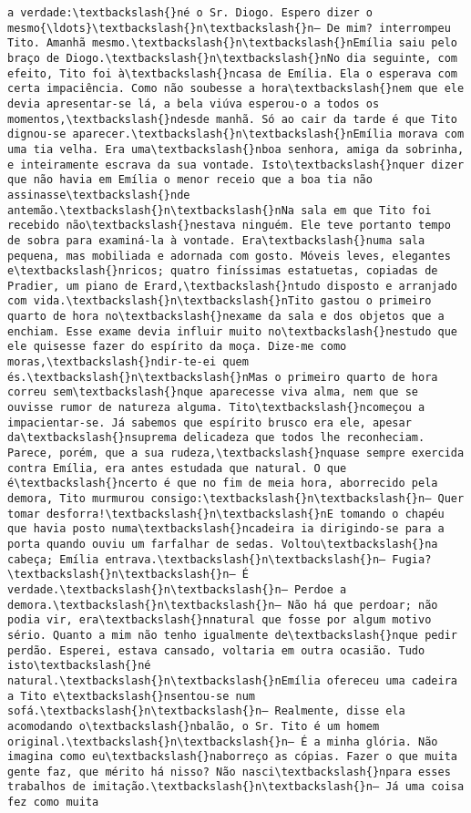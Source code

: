 \begin{Verbatim}[commandchars=\\\{\}]
a verdade:\textbackslash{}né o Sr. Diogo. Espero dizer o mesmo{\ldots}\textbackslash{}n\textbackslash{}n— De mim? interrompeu Tito. Amanhã mesmo.\textbackslash{}n\textbackslash{}nEmília saiu pelo braço de Diogo.\textbackslash{}n\textbackslash{}nNo dia seguinte, com efeito, Tito foi à\textbackslash{}ncasa de Emília. Ela o esperava com certa impaciência. Como não soubesse a hora\textbackslash{}nem que ele devia apresentar-se lá, a bela viúva esperou-o a todos os momentos,\textbackslash{}ndesde manhã. Só ao cair da tarde é que Tito dignou-se aparecer.\textbackslash{}n\textbackslash{}nEmília morava com uma tia velha. Era uma\textbackslash{}nboa senhora, amiga da sobrinha, e inteiramente escrava da sua vontade. Isto\textbackslash{}nquer dizer que não havia em Emília o menor receio que a boa tia não assinasse\textbackslash{}nde antemão.\textbackslash{}n\textbackslash{}nNa sala em que Tito foi recebido não\textbackslash{}nestava ninguém. Ele teve portanto tempo de sobra para examiná-la à vontade. Era\textbackslash{}numa sala pequena, mas mobiliada e adornada com gosto. Móveis leves, elegantes e\textbackslash{}nricos; quatro finíssimas estatuetas, copiadas de Pradier, um piano de Erard,\textbackslash{}ntudo disposto e arranjado com vida.\textbackslash{}n\textbackslash{}nTito gastou o primeiro quarto de hora no\textbackslash{}nexame da sala e dos objetos que a enchiam. Esse exame devia influir muito no\textbackslash{}nestudo que ele quisesse fazer do espírito da moça. Dize-me como moras,\textbackslash{}ndir-te-ei quem és.\textbackslash{}n\textbackslash{}nMas o primeiro quarto de hora correu sem\textbackslash{}nque aparecesse viva alma, nem que se ouvisse rumor de natureza alguma. Tito\textbackslash{}ncomeçou a impacientar-se. Já sabemos que espírito brusco era ele, apesar da\textbackslash{}nsuprema delicadeza que todos lhe reconheciam. Parece, porém, que a sua rudeza,\textbackslash{}nquase sempre exercida contra Emília, era antes estudada que natural. O que é\textbackslash{}ncerto é que no fim de meia hora, aborrecido pela demora, Tito murmurou consigo:\textbackslash{}n\textbackslash{}n— Quer tomar desforra!\textbackslash{}n\textbackslash{}nE tomando o chapéu que havia posto numa\textbackslash{}ncadeira ia dirigindo-se para a porta quando ouviu um farfalhar de sedas. Voltou\textbackslash{}na cabeça; Emília entrava.\textbackslash{}n\textbackslash{}n— Fugia?\textbackslash{}n\textbackslash{}n— É verdade.\textbackslash{}n\textbackslash{}n— Perdoe a demora.\textbackslash{}n\textbackslash{}n— Não há que perdoar; não podia vir, era\textbackslash{}nnatural que fosse por algum motivo sério. Quanto a mim não tenho igualmente de\textbackslash{}nque pedir perdão. Esperei, estava cansado, voltaria em outra ocasião. Tudo isto\textbackslash{}né natural.\textbackslash{}n\textbackslash{}nEmília ofereceu uma cadeira a Tito e\textbackslash{}nsentou-se num sofá.\textbackslash{}n\textbackslash{}n— Realmente, disse ela acomodando o\textbackslash{}nbalão, o Sr. Tito é um homem original.\textbackslash{}n\textbackslash{}n— É a minha glória. Não imagina como eu\textbackslash{}naborreço as cópias. Fazer o que muita gente faz, que mérito há nisso? Não nasci\textbackslash{}npara esses trabalhos de imitação.\textbackslash{}n\textbackslash{}n— Já uma coisa fez como muita 
\end{Verbatim}
